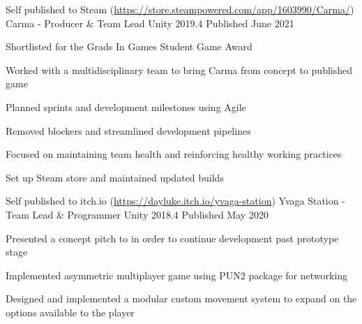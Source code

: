 \begin{cventries}
    \cventry
    {Self published to Steam (\href{https://store.steampowered.com/app/1603990/Carma/}{https://store.steampowered.com/app/1603990/Carma/})}
    {Carma - Producer \& Team Lead}
    {Unity 2019.4}
    {Published June 2021}
    {
        \begin{cvitems}
            \item Shortlisted for the Grads In Games Student Game Award
            \item Worked with a multidisciplinary team to bring Carma from concept to published game
            \item Planned sprints and development milestones using Agile
            \item Removed blockers and streamlined development pipelines
            \item Focused on maintaining team health and reinforcing healthy working practices
            \item Set up Steam store and maintained updated builds
        \end{cvitems}
    }

    \cventry
    {Self published to itch.io (\href{https://dayluke.itch.io/yvaga-station}{https://dayluke.itch.io/yvaga-station})}
    {Yvaga Station - Team Lead \& Programmer}
    {Unity 2018.4}
    {Published May 2020}
    {
        \begin{cvitems}
            \item Presented a concept pitch to in order to continue development past prototype stage
            \item Implemented asymmetric multiplayer game using PUN2 package for networking
            \item Designed and implemented a modular custom movement system to expand on the options available to the player
        \end{cvitems}
    }
\end{cventries}